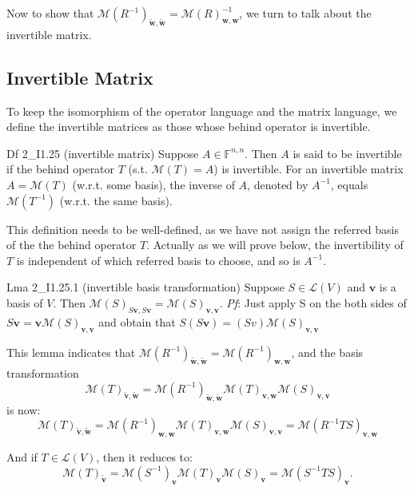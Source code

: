 \documentclass{article}
\newcommand{\basisTilde}[1]{\tilde{\pmb{#1}}}
\begin{document}
Now to show that $\mathcal{M}(R^{-1})_{\basisTilde{w}, \basisTilde{w}} = \mathcal{M}(R)^{-1}_{\pmb{w}, \pmb{w}}$, we turn to talk about the invertible matrix.

\subsection{Invertible Matrix}
To keep the isomorphism of the operator language and the matrix language, we define the invertible matrices as those whose behind operator is invertible.
\begin{Df}{Df 2\_I1.25 (invertible matrix)}
    Suppose $A\in\mathbb{F}^{n,n}$. Then $A$ is said to be invertible if the behind operator $T$ (s.t. $\mathcal{M}(T) = A$) is invertible. For an invertible matrix $A = \mathcal{M}(T)$ (w.r.t. some basis), the inverse of $A$, denoted by $A^{-1}$, equals $\mathcal{M}(T^{-1})$ (w.r.t. the same basis).
\end{Df}
This definition needs to be well-defined, as we have not assign the referred basis of the the behind operator $T$. Actually as we will prove below, \textcolor{Th}{the invertibility of $T$ is independent of which referred basis to choose, and so is $A^{-1}$.}

\begin{Th}{Lma 2\_I1.25.1 (invertible basis transformation)}
    Suppose $S\in\mathcal{L}(V)$ and $\pmb{v}$ is a basis of $V$. Then $\mathcal{M}(S)_{S\pmb{v}, S\pmb{v}} = \mathcal{M}(S)_{\pmb{v}, \pmb{v}}$.
    \tcblower
    \textit{Pf}: Just apply S on the both sides of $S\pmb{v} = \pmb{v}\mathcal{M}(S)_{\pmb{v}, \pmb{v}}$ and obtain that $S(S\pmb{v}) = (Sv)\mathcal{M}(S)_{\pmb{v}, \pmb{v}}$
\end{Th}

This lemma indicates that $\mathcal{M}(R^{-1})_{\basisTilde{w}, \basisTilde{w}} = \mathcal{M}(R^{-1})_{\pmb{w}, \pmb{w}}$, and the basis transformation 
$$\mathcal{M}(T)_{\basisTilde{v}, \basisTilde{w}} = \mathcal{M}(R^{-1})_{\basisTilde{w}, \basisTilde{w}}\mathcal{M}(T)_{\pmb{v}, \pmb{w}}\mathcal{M}(S)_{\pmb{v}, \pmb{v}}$$
is now:
$$\mathcal{M}(T)_{\basisTilde{v}, \basisTilde{w}} = \mathcal{M}(R^{-1})_{\pmb{w}, \pmb{w}}\mathcal{M}(T)_{\pmb{v}, \pmb{w}}\mathcal{M}(S)_{\pmb{v}, \pmb{v}} = \mathcal{M}(R^{-1}TS)_{\pmb{v}, \pmb{w}}$$

And if $T\in\mathcal{L}(V)$, then it reduces to:
$$\mathcal{M}(T)_{\basisTilde{v}} = \mathcal{M}(S^{-1})_{\pmb{v}}\mathcal{M}(T)_{\pmb{v}}\mathcal{M}(S)_{\pmb{v}} = \mathcal{M}(S^{-1}TS)_{\pmb{v}}.$$
\end{document}
